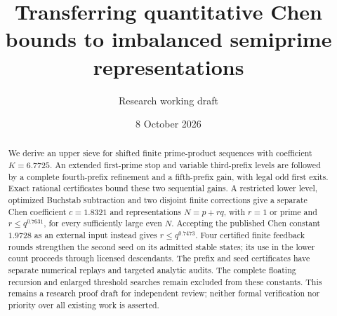 \documentclass[11pt]{article}
\title{Transferring quantitative Chen bounds to imbalanced semiprime representations}
\author{Research working draft}
\date{8 October 2026}
\begin{document}
\maketitle
\begin{abstract}
We derive an upper sieve for shifted finite prime-product sequences
with coefficient $K=6.7725$. An extended first-prime stop and variable
third-prefix levels are followed by a complete fourth-prefix refinement
and a fifth-prefix gain, with legal odd first exits. Exact rational
certificates bound these two sequential gains. A restricted lower level,
optimized Buchstab subtraction and two disjoint finite corrections give
a separate Chen coefficient $c=1.8321$ and representations $N=p+rq$,
with $r=1$ or prime and $r\le q^{0.7631}$, for every sufficiently large
even $N$. Accepting the published Chen constant $1.9728$ as an external
input instead gives $r\le q^{0.7473}$. Four certified finite feedback
rounds strengthen the second seed on its admitted stable states; its
use in the lower count proceeds through licensed descendants.
The prefix and seed certificates have separate numerical replays and
targeted analytic audits. The complete floating recursion and enlarged
threshold searches remain excluded from these constants.
This remains a research proof draft for independent review; neither
formal verification nor priority over all existing work is asserted.
\end{abstract}
\end{document}
